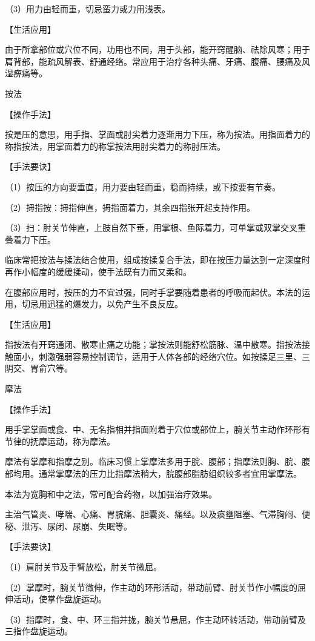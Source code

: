 \documentclass[12pt,UTF8]{ctexbook}
\begin{document}
（3）用力由轻而重，切忌蛮力或力用浅表。

【生活应用】

由于所拿部位或穴位不同，功用也不同，用于头部，能开窍醒脑、祛除风寒；用于肩背部，能疏风解表、舒通经络。常应用于治疗各种头痛、牙痛、腹痛、腰痛及风湿痹痛等。

按法

【操作手法】

按是压的意思，用手指、掌面或肘尖着力逐渐用力下压，称为按法。用指面着力的称指按法，用掌面着力的称掌按法用肘尖着力的称肘压法。

【手法要诀】

（1）按压的方向要垂直，用力要由轻而重，稳而持续，或下按要有节奏。

（2）拇指按：拇指伸直，拇指面着力，其余四指张开起支持作用。

（3）扫：肘关节伸直，上肢自然下垂，用掌根、鱼际着力，可单掌或双掌交叉重叠着力下压。

临床常把按法与揉法结合使用，组成按揉复合手法，即在按压力量达到一定深度时再作小幅度的缓缓揉动，使手法既有力而又柔和。

在腹部应用时，按压的力不宜过强，同时手掌要随着患者的呼吸而起伏。本法的运用，切忌用迅猛的爆发力，以免产生不良反应。

【生活应用】

指按法有开窍通闭、散寒止痛之功能；掌按法则能舒松筋脉、温中散寒。指按法接触面小，刺激强弱容易控制调节，适用于人体各部的经络穴位。如按揉足三里、三阴交、胃俞穴等。

摩法

【操作手法】

用手掌掌面或食、中、无名指相并指面附着于穴位或部位上，腕关节主动作环形有节律的抚摩运动，称为摩法。

摩法有掌摩和指摩之别。临床习惯上掌摩法多用于脘、腹部；指摩法则胸、脘、腹部均用。通常掌摩法的压力比指摩法稍大，脘腹部脂肪组织较多者宜用掌摩法。

本法为宽胸和中之法，常可配合药物，以加强治疗效果。

主治气管炎、哮喘、心痛、胃脘痛、胆囊炎、痛经。以及痰壅阻塞、气滞胸闷、便秘、泄泻、尿闭、尿崩、失眠等。

【手法要诀】

（1）肩肘关节及手臂放松，肘关节微屈。

（2）掌摩时，腕关节微伸，作主动的环形活动，带动前臂、肘关节作小幅度的屈伸活动，使掌作盘旋运动。

（3）指摩时，食、中、环三指并拢，腕关节悬屈，作主动环转活动，带动前臂及三指作盘旋运动。
\end{document}
